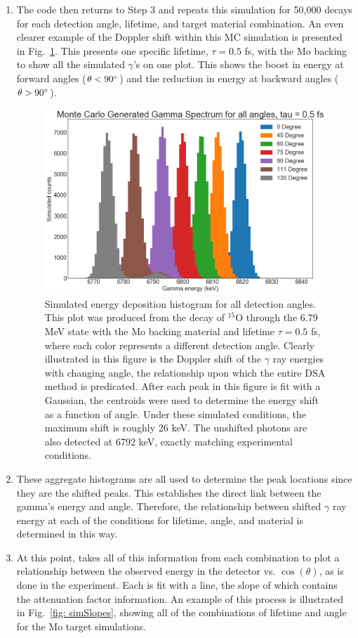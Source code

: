 \begin{enumerate}
\item The code then returns to Step 3 and repeats this simulation for 50,000 decays for each detection angle, lifetime, and target material combination. An even clearer example of the Doppler shift within this MC simulation is presented in Fig.\ \ref{fig: simulatedAll}. This presents one specific lifetime, $\tau=0.5$ fs, with the Mo backing to show all the simulated $\gamma$'s on one plot. This shows the boost in energy at forward angles ($\theta < 90 \degree$) and the reduction in energy at backward angles ($\theta > 90 \degree$). 


\begin{figure}
\centering
\includegraphics[width=\linewidth]{figures/simAllAngles.png}
\caption{Simulated energy deposition histogram for all detection angles. This plot was produced from the decay of $^{15}$O through the 6.79 MeV state with the Mo backing material and lifetime $\tau=0.5$ fs, where each color represents a different detection angle. Clearly illustrated in this figure is the Doppler shift of the $\gamma$ ray energies with changing angle, the relationship upon which the entire DSA method is predicated. After each peak in this figure is fit with a Gaussian, the centroids were used to determine the energy shift as a function of angle. Under these simulated conditions, the maximum shift is roughly 26 keV. The unshifted photons are also detected at 6792 keV, exactly matching experimental conditions.}
\label{fig: simulatedAll}
\end{figure}


\item These aggregate histograms are all used to determine the peak locations since they are the shifted peaks. This establishes the direct link between the gamma's energy and angle. Therefore, the relationship between shifted $\gamma$ ray energy at each of the conditions for lifetime, angle, and material is determined in this way. 
\item At this point, takes all of this information from each combination to plot a relationship between the observed energy in the detector vs. $\cos(\theta)$, as is done in the experiment. Each is fit with a line, the slope of which contains the attenuation factor information. An example of this process is illustrated in Fig.\ \ref{fig: simSlopes}, showing all of the combinations of lifetime and angle for the Mo target simulations.


\end{enumerate}
